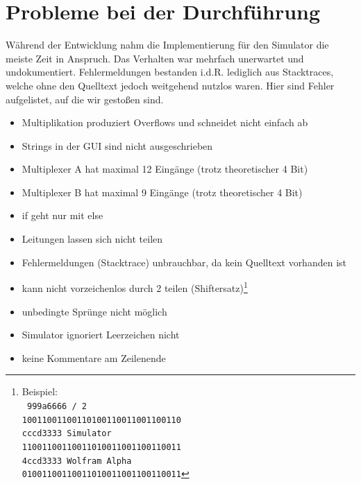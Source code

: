 \section{Probleme bei der Durchführung}
\label{section:Dokumentation-BenchmarkBewertung-Probleme}

Während der Entwicklung nahm die Implementierung für den Simulator die meiste Zeit in Anspruch. Das Verhalten war mehrfach unerwartet und undokumentiert. Fehlermeldungen bestanden i.d.R. lediglich aus Stacktraces, welche ohne den Quelltext jedoch weitgehend nutzlos waren. Hier sind Fehler aufgelistet, auf die wir gestoßen sind.

\begin{itemize}
    \item Multiplikation produziert Overflows und schneidet nicht einfach ab
    \item Strings in der GUI sind nicht ausgeschrieben
    \item Multiplexer A hat maximal 12 Eingänge (trotz theoretischer 4 Bit)
    \item Multiplexer B hat maximal 9 Eingänge (trotz theoretischer 4 Bit)
    \item if geht nur mit else
    \item Leitungen lassen sich nicht teilen
    \item Fehlermeldungen (Stacktrace) unbrauchbar, da kein Quelltext vorhanden ist
    \item kann nicht vorzeichenlos durch 2 teilen (Shiftersatz)\footnote{Beispiel:\\
\texttt{
999a6666 / 2\\
10011001100110100110011001100110\\
cccd3333 Simulator\\
11001100110011010011001100110011\\
4ccd3333 Wolfram Alpha\\
01001100110011010011001100110011}}
    \item unbedingte Sprünge nicht möglich
    \item Simulator ignoriert Leerzeichen nicht
    \item keine Kommentare am Zeilenende
\end{itemize}
